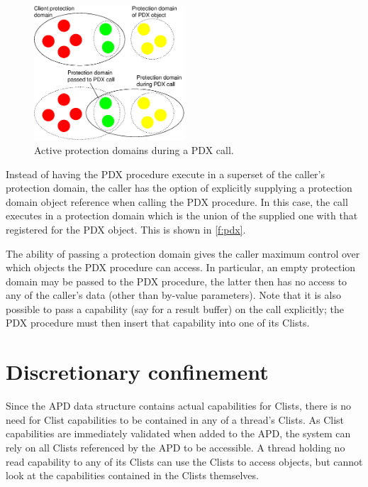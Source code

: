 \documentclass[a4paper,11pt,twoside,dvips]{report}
\begin{document}
\begin{figure}[htb]
\begin{center}
\includegraphics[width=0.5\textwidth]{PDX}
\end{center}
\caption{\label{f:pdx}Active protection domains during a PDX call.}
\end{figure}

Instead of having the PDX procedure execute in a superset of the
caller's protection domain, the caller has the option of explicitly
supplying a protection domain object reference when
calling the PDX procedure. In this case, the call executes in a
protection domain which is the union of the supplied one with that
registered for the PDX object. This is shown in \autoref{f:pdx}.

The ability of passing a protection domain gives the caller maximum
control over which objects the PDX procedure can access. In particular,
an empty protection domain may be passed to the PDX procedure, the
latter then has no access to any of the caller's data (other than
by-value parameters). Note that it is also possible to pass a capability
(say for a result buffer) on the call explicitly; the PDX procedure must
then insert that capability into one of its Clists.

\section{\label{s:confine}\label{s:apdlock}Discretionary confinement}

Since the APD data structure contains actual capabilities for
Clists, there is no need for Clist capabilities to be contained in any
of a thread's Clists. As Clist capabilities are immediately validated
when added to the APD, the system can rely on all Clists referenced by
the APD to be accessible. A thread holding no read capability to any of
its Clists can use the Clists to access objects, but cannot look at the
capabilities contained in the Clists themselves.
\end{document}
